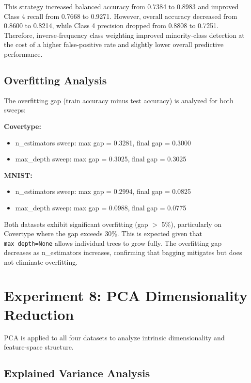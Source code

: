 \documentclass[conference,12pt]{IEEEtran}
\begin{document}
This strategy increased balanced accuracy from 0.7384 to 0.8983 and improved Class 4 recall from 0.7668 to 0.9271. However, overall accuracy decreased from 0.8600 to 0.8214, while Class 4 precision dropped from 0.8808 to 0.7251. Therefore, inverse-frequency class weighting improved minority-class detection at the cost of a higher false-positive rate and slightly lower overall predictive performance.

\subsection{Overfitting Analysis}

The overfitting gap (train accuracy minus test accuracy) is analyzed for both sweeps:

\textbf{Covertype:}
\begin{itemize}
    \item n\_estimators sweep: max gap = 0.3281, final gap = 0.3000
    \item max\_depth sweep: max gap = 0.3025, final gap = 0.3025
\end{itemize}

\textbf{MNIST:}
\begin{itemize}
    \item n\_estimators sweep: max gap = 0.2994, final gap = 0.0825
    \item max\_depth sweep: max gap = 0.0988, final gap = 0.0775
\end{itemize}

Both datasets exhibit significant overfitting (gap $>$ 5\%), particularly on Covertype where the gap exceeds 30\%. This is expected given that \texttt{max\_depth=None} allows individual trees to grow fully. The overfitting gap decreases as n\_estimators increases, confirming that bagging mitigates but does not eliminate overfitting.

\section{Experiment 8: PCA Dimensionality Reduction}

PCA is applied to all four datasets to analyze intrinsic dimensionality and feature-space structure.

\subsection{Explained Variance Analysis}
\end{document}
